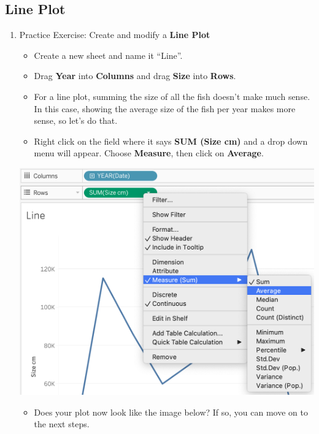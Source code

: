 \documentclass[
]{book}
\providecommand{\tightlist}{%
  \setlength{\itemsep}{0pt}\setlength{\parskip}{0pt}}
\begin{document}
\hypertarget{line-plot}{%
\subsection{Line Plot}\label{line-plot}}

\begin{enumerate}
\def\labelenumi{\arabic{enumi}.}
\item
  Practice Exercise: Create and modify a \textbf{Line Plot}

  \begin{itemize}
  \tightlist
  \item
    Create a new sheet and name it ``Line''.
  \item
    Drag \textbf{Year} into \textbf{Columns} and drag \textbf{Size} into \textbf{Rows}.
  \item
    For a line plot, summing the size of all the fish doesn't make much sense. In this case, showing the average size of the fish per year makes more sense, so let's do that.
  \item
    Right click on the field where it says \textbf{SUM (Size cm)} and a drop down menu will appear. Choose \textbf{Measure}, then click on \textbf{Average}.
  \end{itemize}

  \includegraphics{images/M3S2_change-measure.png}

  \begin{itemize}
  \tightlist
  \item
    Does your plot now look like the image below? If so, you can move on to the next steps.
  \end{itemize}
\end{enumerate}
\end{document}
